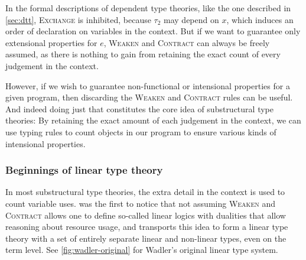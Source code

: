 In the formal descriptions of dependent type theories, like the one described in \cref{sec:dtt}, \textsc{Exchange} is inhibited, because $\tau_2$ may depend on $x$, which induces an order of declaration on variables in the context. But if we want to guarantee only extensional properties for $e$, \textsc{Weaken} and \textsc{Contract} can always be freely assumed, as there is nothing to gain from retaining the exact count of every judgement in the context. 

However, if we wish to guarantee non-functional or intensional properties for a given program, then discarding the \textsc{Weaken} and \textsc{Contract} rules can be useful. And indeed doing just that constitutes the core idea of substructural type theories: By retaining the exact amount of each judgement in the context, we can use typing rules to count objects in our program to ensure various kinds of intensional properties.

\subsubsection{Beginnings of linear type theory}
In most substructural type theories, the extra detail in the context is used to count variable uses. \cite{girard_linear_1987} was the first to notice that not assuming \textsc{Weaken} and \textsc{Contract} allows one to define so-called linear logics with dualities that allow reasoning about resource usage, and \cite{wadler_linear_1990} transports this idea to form a linear type theory with a set of entirely separate linear and non-linear types, even on the term level. See \cref{fig:wadler-original} for Wadler's original linear type system.

